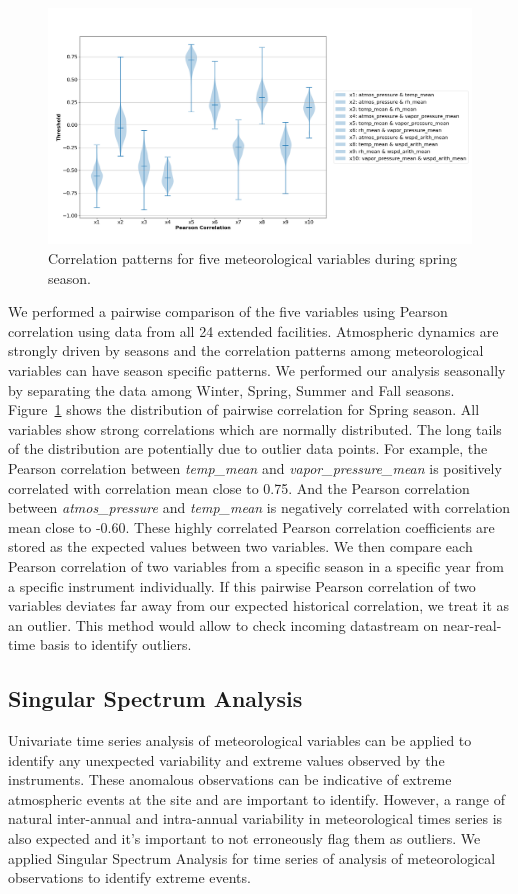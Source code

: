 \begin{figure}[ht]
    \centering
    \includegraphics[width=\textwidth]{figures/Spring.png}
    \caption{Correlation patterns for five meteorological variables
		during spring season.}
    \label{fig:pc}
\end{figure}

We performed a pairwise comparison of the five variables using Pearson
correlation using data from all 24 extended facilities. Atmospheric
dynamics are strongly driven by seasons and the correlation patterns
among meteorological variables can have season specific patterns. We
performed our analysis seasonally by separating the data among Winter, Spring,
Summer and Fall seasons. Figure~\ref{fig:pc} shows the distribution of
pairwise correlation for Spring season. All variables show strong
correlations which are normally distributed. The long tails of the
distribution are potentially due to outlier data points. 
For example, the Pearson correlation between
\textit{temp\_mean} and \textit{vapor\_pressure\_mean} is positively
correlated with correlation mean close to 0.75. And the Pearson
correlation between \textit{atmos\_pressure} and \textit{temp\_mean} is
negatively correlated with correlation mean close to -0.60. These highly
correlated Pearson correlation coefficients are stored as the expected
values between two variables. We then compare each Pearson correlation
of two variables from a specific season in a specific year from a
specific instrument individually. If this pairwise Pearson correlation
of two variables deviates far away from our expected historical
correlation, we treat it as an outlier. This method would allow to check
incoming datastream on near-real-time basis to identify outliers.

\subsection{Singular Spectrum Analysis}
Univariate time series analysis of meteorological variables can be
applied to identify any unexpected variability and extreme values
observed by the instruments. These anomalous observations can be
indicative of extreme atmospheric events at the site and are important
to identify. However, a range of natural inter-annual and intra-annual variability in
meteorological times series is also expected and it's important to not
erroneously flag them as outliers. We applied Singular Spectrum Analysis
for time series of analysis of meteorological observations to identify
extreme events.

